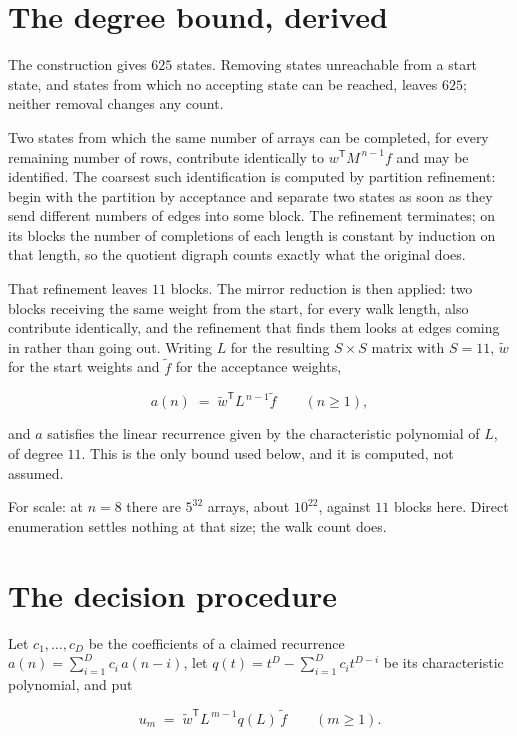\documentclass[11pt]{article}
\theoremstyle{definition}
\begin{document}
\section{The degree bound, derived}

The construction gives $625$ states. Removing states unreachable from a start state, and states from which no accepting state can be reached, leaves $625$; neither removal changes any count.

Two states from which the same number of arrays can be completed, for every remaining number of rows, contribute identically to $w^{\mathsf T}M^{\,n-1}f$ and may be identified. The coarsest such identification is computed by partition refinement: begin with the partition by acceptance and separate two states as soon as they send different numbers of edges into some block. The refinement terminates; on its blocks the number of completions of each length is constant by induction on that length, so the quotient digraph counts exactly what the original does.

That refinement leaves $11$ blocks. The mirror reduction is then applied: two blocks receiving the same weight from the start, for every walk length, also contribute identically, and the refinement that finds them looks at edges coming in rather than going out. Writing $L$ for the resulting $S \times S$ matrix with $S = 11$, $\tilde w$ for the start weights and $\tilde f$ for the acceptance weights,

\[a(n) \;=\; \tilde w^{\mathsf T} L^{\,n-1} \tilde f \qquad (n \ge 1),\]

and $a$ satisfies the linear recurrence given by the characteristic polynomial of $L$, of degree $11$. This is the only bound used below, and it is computed, not assumed.

For scale: at $n = 8$ there are $5^{32}$ arrays, about $10^{22}$, against $11$ blocks here. Direct enumeration settles nothing at that size; the walk count does.

\section{The decision procedure}

Let $c_1,\dots,c_D$ be the coefficients of a claimed recurrence $a(n) = \sum_{i=1}^{D} c_i\,a(n-i)$, let $q(t) = t^{D} - \sum_{i=1}^{D} c_i t^{D-i}$ be its characteristic polynomial, and put

\[u_m \;=\; \tilde w^{\mathsf T} L^{\,m-1} q(L)\,\tilde f \qquad (m \ge 1).\]
\end{document}
